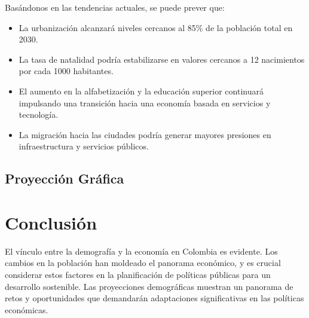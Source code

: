 \documentclass{article}
\begin{document}
Basándonos en las tendencias actuales, se puede prever que:

\begin{itemize}
    \item La urbanización alcanzará niveles cercanos al 85\% de la población total en 2030.
    \item La tasa de natalidad podría estabilizarse en valores cercanos a 12 nacimientos por cada 1000 habitantes.
    \item El aumento en la alfabetización y la educación superior continuará impulsando una transición hacia una economía basada en servicios y tecnología.
    \item La migración hacia las ciudades podría generar mayores presiones en infraestructura y servicios públicos.
\end{itemize}

\subsection{Proyección Gráfica}


\section{Conclusión}

El vínculo entre la demografía y la economía en Colombia es evidente. Los cambios en la población han moldeado el panorama económico, y es crucial considerar estos factores en la planificación de políticas públicas para un desarrollo sostenible. Las proyecciones demográficas muestran un panorama de retos y oportunidades que demandarán adaptaciones significativas en las políticas económicas.
\end{document}
